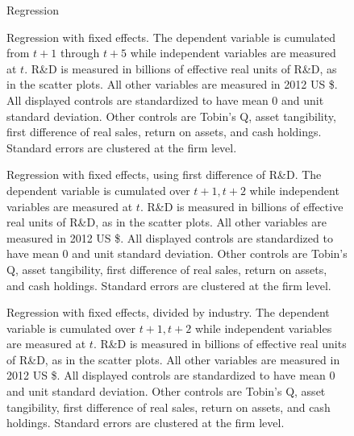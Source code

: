 \documentclass[12pt,english]{article}
\theoremstyle{remark}
\begin{document}
\begin{figure}[p]
	\centering
	
	\caption{Regression}
	\label{regs_allSpinouts_fd_nofe}
\end{figure}

\begin{figure}[p]
	\centering
	
	\caption{Regression with fixed effects. The dependent variable is cumulated from $t+1$ through $t+5$ while independent variables are measured at $t$. R\&D is measured in billions of effective real units of R\&D, as in the scatter plots. All other variables are measured in 2012 US \$. All displayed controls are standardized to have mean 0 and unit standard deviation. Other controls are Tobin's Q, asset tangibility, first difference of real sales, return on assets, and cash holdings. Standard errors are clustered at the firm level.}
	\label{regs_allSpinouts_FE}
\end{figure}

\begin{figure}[p]
	\centering
	
	\caption{Regression with fixed effects, using first difference of R\&D. The dependent variable is cumulated over $t+1,t+2$ while independent variables are measured at $t$. R\&D is measured in billions of effective real units of R\&D, as in the scatter plots. All other variables are measured in 2012 US \$. All displayed controls are standardized to have mean 0 and unit standard deviation. Other controls are Tobin's Q, asset tangibility, first difference of real sales, return on assets, and cash holdings. Standard errors are clustered at the firm level.}
	\label{regs_allSpinouts_fd_FE}
\end{figure}

\begin{figure}[p]
	\centering
	
	\caption{Regression with fixed effects, divided by industry. The dependent variable is cumulated over $t+1,t+2$ while independent variables are measured at $t$. R\&D is measured in billions of effective real units of R\&D, as in the scatter plots. All other variables are measured in 2012 US \$. All displayed controls are standardized to have mean 0 and unit standard deviation. Other controls are Tobin's Q, asset tangibility, first difference of real sales, return on assets, and cash holdings. Standard errors are clustered at the firm level.}
	\label{regs_spinouts_wso_fe}
\end{figure}
\end{document}

